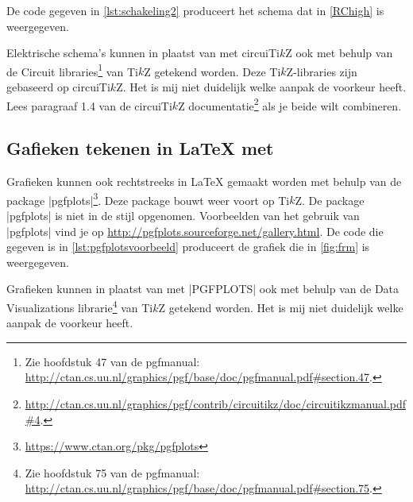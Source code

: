 De code gegeven in \cref{lst:schakeling2} produceert het schema dat in \cref{RChigh} is weergegeven.



Elektrische schema's kunnen in plaatst van met circuiTi$k$Z ook met behulp van de Circuit libraries\footnote{%
	Zie hoofdstuk 47 van de pgfmanual: \url{http://ctan.cs.uu.nl/graphics/pgf/base/doc/pgfmanual.pdf\#section.47}.
} van Ti$k$Z getekend worden. 
Deze Ti$k$Z-libraries zijn gebaseerd op circuiTi$k$Z.
Het is mij niet duidelijk welke aanpak de voorkeur heeft.
Lees paragraaf 1.4 van de circuiTi$k$Z documentatie\footnote{%
	\url{http://ctan.cs.uu.nl/graphics/pgf/contrib/circuitikz/doc/circuitikzmanual.pdf\#4}.
} als je beide wilt combineren.   

\subsection{Gafieken tekenen in \LaTeX{} met \texorpdfstring{}{pgfplots}}
Grafieken kunnen ook rechtstreeks in \LaTeX{} gemaakt worden met behulp van de package |pgfplots|\footnote{\url{https://www.ctan.org/pkg/pgfplots}}.
Deze package bouwt weer voort op Ti$k$Z.
De package |pgfplots| is niet in de stijl opgenomen.
Voorbeelden van het gebruik van |pgfplots| vind je op \url{http://pgfplots.sourceforge.net/gallery.html}.
De code die gegeven is in \cref{lst:pgfplotsvoorbeeld} produceert de grafiek die in \cref{fig:frm} is weergegeven.

Grafieken kunnen in plaatst van met |PGFPLOTS| ook met behulp van de Data Visualizations librarie\footnote{%
	Zie hoofdstuk 75 van de pgfmanual: \url{http://ctan.cs.uu.nl/graphics/pgf/base/doc/pgfmanual.pdf\#section.75}.
} van Ti$k$Z getekend worden.
Het is mij niet duidelijk welke aanpak de voorkeur heeft.

